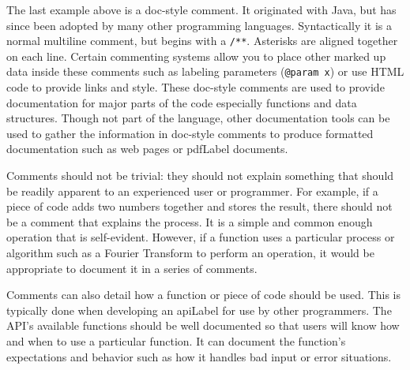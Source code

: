 The last example above is a doc-style comment.  It originated
with Java, but has since been adopted by many other programming
languages.  Syntactically it is a normal multiline comment, but
begins with a \texttt{/**}.  Asterisks are aligned together
on each line.  Certain commenting systems allow you to place
other marked up data inside these comments such as labeling
parameters (\texttt{@param x}) or use HTML code
to provide links and style.  These doc-style comments are used 
to provide
documentation for major parts of the code especially functions
and data structures.  Though not part of the language, other
documentation tools can be used to gather the information in
doc-style comments to produce formatted documentation such as web pages
or \gls{pdfLabel} documents.

Comments should not be trivial: they should not explain something
that should be readily apparent to an experienced user or
programmer.  For example, if a piece of code adds two
numbers together and stores the result, there should not
be a comment that explains the process.  It is a simple and
common enough operation that is self-evident.  However,
if a function uses a particular process or algorithm such
as a Fourier Transform to perform an operation, it would
be appropriate to document it in a series of comments.

Comments can also detail how a function or piece of code
should be used.  This is typically done when developing an
\gls{apiLabel} for use by other programmers.  The API's
available functions should be well documented so that users
will know how and when to use a particular function.  It
can document the function's expectations and behavior such
as how it handles bad input or error situations.

